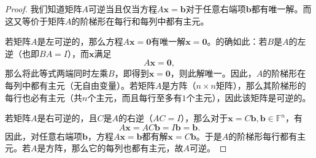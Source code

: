 \begin{proof}
  我们知道矩阵$A$可逆当且仅当方程$A\mathbf{x}=\mathbf{b}$对于任意右端项$\mathbf{b}$都有唯一解。而这又等价于矩阵$A$的阶梯形在每行和每列中都有主元。

  若矩阵$A$是左可逆的，那么方程$A\mathbf{x}=\mathbf{0}$有唯一解$\mathbf{x}=\mathbf{0}$。的确如此：若$B$是$A$的左逆（也即$BA=I$），而$\mathbf{x}$满足\[A\mathbf{x}=\mathbf{0},\]
  那么将此等式两端同时左乘$B$，即得到$\mathbf{x}=\mathbf{0}$，则此解唯一。因此，$A$的阶梯形在每列中都有主元（无自由变量）。若矩阵$A$是方阵（$n\times n$矩阵），那么其阶梯形的每行也必有主元（共$n$个主元，而且每行至多有$1$个主元），因此该矩阵是可逆的。

  若矩阵$A$是右可逆的，且$C$是$A$的右逆（$AC=I$），那么对于$\mathbf{x}=C\mathbf{b},\mathbf{b}\in\mathbb{F}^{n}$，有\[A\mathbf{x}=AC\mathbf{b}=I\mathbf{b}=\mathbf{b}.\]
  因此，对任意右端项$\mathbf{b}$，方程$A\mathbf{x}=\mathbf{b}$都有解$\mathbf{x}=C\mathbf{b}$。于是$A$的阶梯形每行都有主元。若$A$是方阵，那么它的每列也都有主元，故$A$可逆。
\end{proof}

